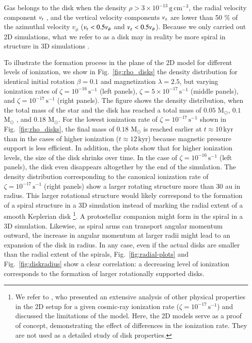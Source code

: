 \documentclass{aa}
\newcommand{\unit}[1]{\ensuremath{\, \mathrm{#1}}}
\newcommand{\Fig}[1]{Fig.~\ref{fig:#1}}    %
\begin{document}
Gas belongs to the disk when the density $\rho > 3\times 10^{-13}\unit{g}\unit{cm}^{-3}$, the radial velocity component $v_{\rm r}$ , and the vertical velocity components $v_{\rm z}$ are lower than 50 $\%$ of the azimuthal velocity $v_{\phi}$ ($v_{\rm r} < 0.5 v_{\phi}$ and $v_{\rm z} < 0.5 v_{\phi}$).  
Because we only carried out 2D simulations, what we refer to as a disk may in reality be more spiral in structure in 3D simulations \citep[see][]{Zhao2018}. 


To illustrate the formation process in the plane of the 2D model for different levels of ionization, we show in \Fig{rho_disks} the density distribution for identical initial rotation $\beta=0.1$ and magnetization $\lambda=2.5$, but varying ionization rates of $\zeta=10^{-16}\unit{s}^{-1}$ (left panels), $\zeta=5\times10^{-17}\unit{s}^{-1}$ (middle panels), and $\zeta=10^{-17}\unit{s}^{-1}$ (right panels). 
The figure shows the density distribution, when the total mass of the star and the disk has reached a total mass of $0.05$ M$_{\odot}$, $0.1$ M$_{\odot}$ , and $0.18$ M$_{\odot}$. 
For the lowest ionization rate of $\zeta=10^{-17} \unit{s}^{-1}$ shown in \Fig{rho_disks}, the final mass of $0.18$ M$_{\odot}$ is reached earlier at $t\approx 10 \unit{kyr}$ than in the cases of higher ionization ($t\approx 12 \unit{kyr}$) because magnetic pressure support is less efficient. 
In addition, the plots show that for higher ionization levels, the size of the disk shrinks over time. 
In the case of $\zeta=10^{-16} \unit{s}^{-1}$ (left panels), the disk even disappears altogether by the end of the simulation. 
The density distribution corresponding to the canonical ionization rate of $\zeta=10^{-17} \unit{s}^{-1}$ (right panels) show a larger rotating structure more than $30$ au in radius. 
This larger rotational structure would likely correspond to the formation of a spiral structure in a 3D simulation instead of marking the radial extent of a smooth Keplerian disk \cite[see the discussion in][]{Zhao2018} \footnote{We refer to \citet{Zhao2016}, who presented an extensive analysis of other physical properties in the 2D setup for a given cosmic-ray ionization rate ($\zeta=10^{-17}\unit{s}^{-1}$) and discussed the limitations of the model. 
Here, the 2D models serve as a proof of concept, demonstrating the effect of differences in the ionization rate. They are not used as a detailed study of disk properties. }. 
A protostellar companion might form in the spiral in a 3D simulation. 
Likewise, as spiral arms can transport angular momentum outward, the increase in angular momentum at larger radii might lead to an expansion of the disk in radius. 
In any case, even if the actual disks are smaller than the radial extent of the spirals, \Fig{radial-plots} and \Fig{diskradius} show a clear correlation: a decreasing level of ionization corresponds to the formation of larger rotationally supported disks.
\end{document}
